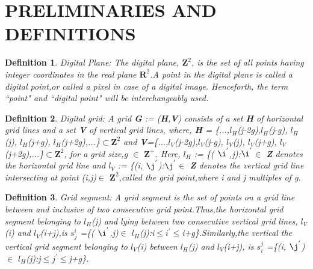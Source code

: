 \documentclass[12pt]{article}
\newtheorem{DEF}{Definition}
\begin{document}
\newpage




\section{PRELIMINARIES AND DEFINITIONS}
\begin{DEF}
  \textnormal{Digital Plane}: The digital plane, $\textbf{Z}^2$, is the set of all points having integer coordinates in the real plane $\textbf{R}^2$.A point in the digital plane is called a digital point,or called a pixel in case of a digital image. Henceforth, the term ``point" and ``digital point" will be interchangeably used.
\end{DEF}


\begin{DEF}
\textnormal{Digital grid}: A grid \textbf{G} := (\textbf{H},\textbf{V}) consists of a set \textbf{H} of horizontal grid lines and a set \textbf{V} of vertical grid lines, where, \textbf{H} = \{...,${\textit{l}}_H$(\textit{j-2g}),${\textit{l}}_H$(\textit{j-g}), ${\textit{l}}_H$(\textit{j}), ${\textit{l}}_H$(\textit{j+g}), ${\textit{l}}_H$(\textit{j+2g}),...\}{$\subset $$\textbf{Z}^2$} and \textbf{V}=\{...,${\textit{l}}_V$(\textit{j-2g}),${\textit{l}}_V$(\textit{j-g}), ${\textit{l}}_V$(\textit{j}), ${\textit{l}}_V$(\textit{j+g}), ${\textit{l}}_V$(\textit{j+2g}),...\}{$\subset $$\textbf{Z}^2$}, for a grid size,\textit{g} $\in$ {$\textbf{Z}^+$}. Here, ${\textit{l}}_H$ := \{(\textit{ $\i^{'}$},\textit{j}):\textit{$\i^{'}$}$\in$ \textbf{Z} denotes the horizontal grid line and ${\textit{l}}_V$ := \{(\textit{i},\textit{ $\j^{'}$}):\textit{$\j^{'}$}$\in$ \textbf{Z} denotes the vertical grid line intersecting at point (\textit{i},\textit{j})$\in$ $\textbf{Z}^2$,called the grid point,where i and j multiples of g.
\end{DEF}


\begin{DEF}
\textnormal{Grid segment}: A grid segment is the set of points on a grid line between and inclusive of two consecutive grid point.Thus,the horizontal grid segment belonging to ${\textit{l}}_H$(\textit{j}) and lying between two consecutive vertical grid lines, ${\textit{l}}_V$(\textit{i}) and ${\textit{l}}_V$(\textit{i}+\textit{j}),is  \textit{$s_j^{i}$} =\{(\textit{ $\i^{'}$},\textit{j})$\in$ ${\textit{l}}_H$(\textit{j}):\textit{i}$\leq$\textit{$i^{'}$}$\leq$\textit{i}+\textit{g}\}.Similarly,the vertical the vertical grid segment belonging to ${\textit{l}}_V$(\textit{i}) between ${\textit{l}}_H$(\textit{j}) and ${\textit{l}}_V$(\textit{i}+\textit{j}), is \textit{$s_i^{j}$} =\{(\textit{i},\textit{ $\j^{'}$})$\in$ ${\textit{l}}_H$(\textit{j}):\textit{j}$\leq$\textit{$j^{'}$}$\leq$\textit{j}+\textit{g}\}.
\end{DEF}
\end{document}
